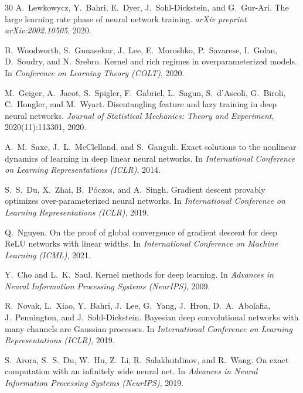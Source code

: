 \documentclass[11pt]{article}
\theoremstyle{definition}
\begin{document}
\begin{thebibliography}{30}
A.~Lewkowycz, Y.~Bahri, E.~Dyer, J.~Sohl-Dickstein, and G.~Gur-Ari.
\newblock The large learning rate phase of neural network training.
\newblock \emph{arXiv preprint arXiv:2002.10505}, 2020.

B.~Woodworth, S.~Gunasekar, J.~Lee, E.~Moroshko, P.~Savarese, I.~Golan, D.~Soudry, and N.~Srebro.
\newblock Kernel and rich regimes in overparameterized models.
\newblock In \emph{Conference on Learning Theory (COLT)}, 2020.

M.~Geiger, A.~Jacot, S.~Spigler, F.~Gabriel, L.~Sagun, S.~d'Ascoli, G.~Biroli, C.~Hongler, and M.~Wyart.
\newblock Disentangling feature and lazy training in deep neural networks.
\newblock \emph{Journal of Statistical Mechanics: Theory and Experiment}, 2020(11):113301, 2020.

A.~M.~Saxe, J.~L.~McClelland, and S.~Ganguli.
\newblock Exact solutions to the nonlinear dynamics of learning in deep linear neural networks.
\newblock In \emph{International Conference on Learning Representations (ICLR)}, 2014.

S.~S.~Du, X.~Zhai, B.~P{\'o}czos, and A.~Singh.
\newblock Gradient descent provably optimizes over-parameterized neural networks.
\newblock In \emph{International Conference on Learning Representations (ICLR)}, 2019.

Q.~Nguyen.
\newblock On the proof of global convergence of gradient descent for deep {ReLU} networks with linear widths.
\newblock In \emph{International Conference on Machine Learning (ICML)}, 2021.

Y.~Cho and L.~K.~Saul.
\newblock Kernel methods for deep learning.
\newblock In \emph{Advances in Neural Information Processing Systems (NeurIPS)}, 2009.

R.~Novak, L.~Xiao, Y.~Bahri, J.~Lee, G.~Yang, J.~Hron, D.~A.~Abolafia, J.~Pennington, and J.~Sohl-Dickstein.
\newblock Bayesian deep convolutional networks with many channels are {G}aussian processes.
\newblock In \emph{International Conference on Learning Representations (ICLR)}, 2019.

S.~Arora, S.~S.~Du, W.~Hu, Z.~Li, R.~Salakhutdinov, and R.~Wang.
\newblock On exact computation with an infinitely wide neural net.
\newblock In \emph{Advances in Neural Information Processing Systems (NeurIPS)}, 2019.


\end{thebibliography}
\end{document}

